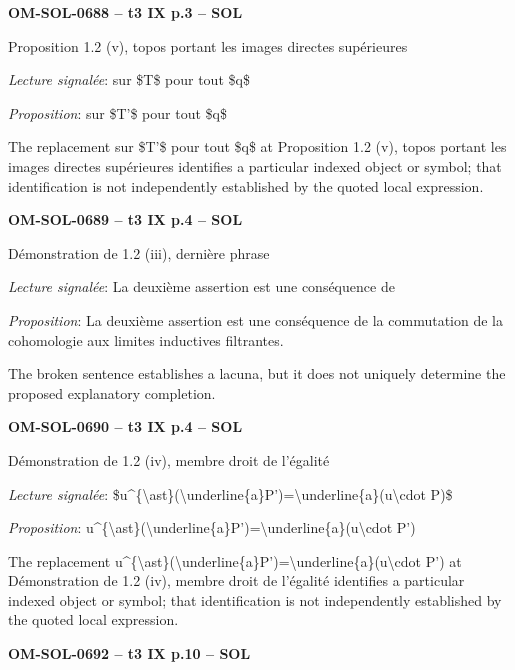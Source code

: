 \par\noindent\textbf{OM-SOL-0688 -- t3 IX p.3 -- SOL}\par
Proposition 1.2 (v), topos portant les images directes supérieures\par
\emph{Lecture signalée}: sur \$T\$ pour tout \$q\$\par
\emph{Proposition}: sur \$T'\$ pour tout \$q\$\par
The replacement sur \$T'\$ pour tout \$q\$ at Proposition 1.2 (v), topos portant les images directes supérieures identifies a particular indexed object or symbol; that identification is not independently established by the quoted local expression.\par
\par\noindent\textbf{OM-SOL-0689 -- t3 IX p.4 -- SOL}\par
Démonstration de 1.2 (iii), dernière phrase\par
\emph{Lecture signalée}: La deuxième assertion est une conséquence de\par
\emph{Proposition}: La deuxième assertion est une conséquence de la commutation de la cohomologie aux limites inductives filtrantes.\par
The broken sentence establishes a lacuna, but it does not uniquely determine the proposed explanatory completion.\par
\par\noindent\textbf{OM-SOL-0690 -- t3 IX p.4 -- SOL}\par
Démonstration de 1.2 (iv), membre droit de l'égalité\par
\emph{Lecture signalée}: \$u\textasciicircum{}\{\textbackslash{}ast\}(\textbackslash{}underline\{a\}P')=\allowbreak \textbackslash{}underline\{a\}(u\textbackslash{}cdot P)\$\par
\emph{Proposition}: u\textasciicircum{}\{\textbackslash{}ast\}(\textbackslash{}underline\{a\}P')=\allowbreak \textbackslash{}underline\{a\}(u\textbackslash{}cdot P')\par
The replacement u\textasciicircum{}\{\textbackslash{}ast\}(\textbackslash{}underline\{a\}P')=\allowbreak \textbackslash{}underline\{a\}(u\textbackslash{}cdot P') at Démonstration de 1.2 (iv), membre droit de l'égalité identifies a particular indexed object or symbol; that identification is not independently established by the quoted local expression.\par
\par\noindent\textbf{OM-SOL-0692 -- t3 IX p.10 -- SOL}\par
